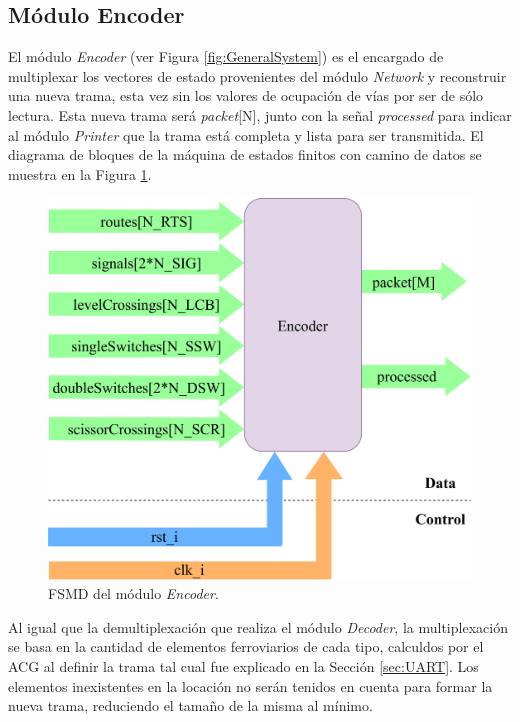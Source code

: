 \subsection{Módulo Encoder}
	\label{sec:encoder}
	
	El módulo \textit{Encoder} (ver Figura \ref{fig:GeneralSystem}) es el encargado de multiplexar los vectores de estado provenientes del módulo \textit{Network} y reconstruir una nueva trama, esta vez sin los valores de ocupación de vías por ser de sólo lectura. Esta nueva trama será \textit{packet}[N], junto con la señal \textit{processed} para indicar al módulo \textit{Printer} que la trama está completa y lista para ser transmitida. El diagrama de bloques de la máquina de estados finitos con camino de datos se muestra en la Figura \ref{fig:Encoder_module}.
	
	\begin{figure}[H]
		\centering
		\includegraphics[width=1\textwidth]{Figuras/Encoder_module.png}
		\centering\caption{FSMD del módulo \textit{Encoder}.}
		\label{fig:Encoder_module}
	\end{figure}
	
	Al igual que la demultiplexación que realiza el módulo \textit{Decoder}, la multiplexación se basa en la cantidad de elementos ferroviarios de cada tipo, calculdos por el ACG al definir la trama tal cual fue explicado en la Sección \ref{sec:UART}. Los elementos inexistentes en la locación no serán tenidos en cuenta para formar la nueva trama, reduciendo el tamaño de la misma al mínimo.